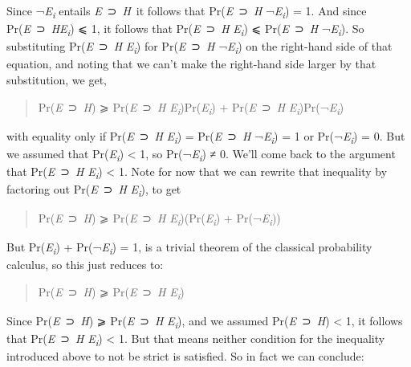\documentclass[
  11pt,
  letterpaper,
  DIV=11,
  numbers=noendperiod,
  twoside]{scrartcl}
\begin{document}
Since ¬\emph{E\textsubscript{i}} entails \emph{E}~⊃~\emph{H}~it follows
that Pr(\emph{E}~⊃~\emph{H}\textbar{} ¬\emph{E\textsubscript{i}}) = 1.
And since Pr(\emph{E}~⊃~\emph{H}\textbar{}\emph{E\textsubscript{i}}) ⩽
1, it follows that Pr(\emph{E}~⊃~\emph{H}\textbar{}
\emph{E\textsubscript{i}}) ⩽ Pr(\emph{E}~⊃~\emph{H}\textbar{}
¬\emph{E\textsubscript{i}}). So substituting
Pr(\emph{E}~⊃~\emph{H}\textbar{} \emph{E\textsubscript{i}}) for
Pr(\emph{E}~⊃~\emph{H}\textbar{} ¬\emph{E\textsubscript{i}}) on the
right-hand side of that equation, and noting that we can't make the
right-hand side larger by that substitution, we get,

\begin{quote}
Pr(\emph{E}~⊃~\emph{H}) ⩾ Pr(\emph{E}~⊃~\emph{H}\textbar{}
\emph{E\textsubscript{i}})Pr(\emph{E\textsubscript{i}}) +
Pr(\emph{E}~⊃~\emph{H}\textbar{}
\emph{E\textsubscript{i}})Pr(¬\emph{E\textsubscript{i}})
\end{quote}

with equality only if Pr(\emph{E}~⊃~\emph{H}\textbar{}
\emph{E\textsubscript{i}}) = Pr(\emph{E}~⊃~\emph{H}\textbar{}
¬\emph{E\textsubscript{i}}) = 1 or Pr(¬\emph{E\textsubscript{i}}) = 0.
But we assumed that Pr(\emph{E\textsubscript{i}}) \textless{} 1, so
Pr(¬\emph{E\textsubscript{i}}) ≠ 0. We'll come back to the argument that
Pr(\emph{E}~⊃~\emph{H}\textbar{} \emph{E\textsubscript{i}}) \textless{}
1. Note for now that we can rewrite that inequality by factoring out
Pr(\emph{E}~⊃~\emph{H}\textbar{} \emph{E\textsubscript{i}}), to get

\begin{quote}
Pr(\emph{E}~⊃~\emph{H}) ⩾ Pr(\emph{E}~⊃~\emph{H}\textbar{}
\emph{E\textsubscript{i}})(Pr(\emph{E\textsubscript{i}}) +
Pr(¬\emph{E\textsubscript{i}}))
\end{quote}

But Pr(\emph{E\textsubscript{i}}) + Pr(¬\emph{E\textsubscript{i}}) = 1,
is a trivial theorem of the classical probability calculus, so this just
reduces to:

\begin{quote}
Pr(\emph{E}~⊃~\emph{H}) ⩾ Pr(\emph{E}~⊃~\emph{H}\textbar{}
\emph{E\textsubscript{i}})
\end{quote}

Since Pr(\emph{E}~⊃~\emph{H}) ⩾ Pr(\emph{E}~⊃~\emph{H}\textbar{}
\emph{E\textsubscript{i}}), and we assumed Pr(\emph{E}~⊃~\emph{H})
\textless{} 1, it follows that Pr(\emph{E}~⊃~\emph{H}\textbar{}
\emph{E\textsubscript{i}}) \textless{} 1. But that means neither
condition for the inequality introduced above to not be strict is
satisfied. So in fact we can conclude:
\end{document}
